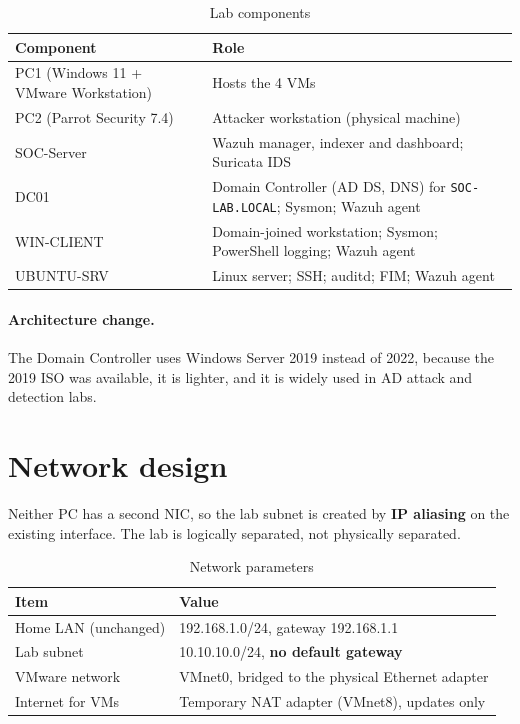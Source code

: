 \documentclass[11pt,a4paper]{article}
\begin{document}
\begin{table}[h]
\centering
\begin{tabularx}{\textwidth}{lX}
\toprule
Component & Role \\
\midrule
PC1 (Windows 11 + VMware Workstation) & Hosts the 4 VMs \\
PC2 (Parrot Security 7.4) & Attacker workstation (physical machine) \\
SOC-Server & Wazuh manager, indexer and dashboard; Suricata IDS \\
DC01 & Domain Controller (AD DS, DNS) for \texttt{SOC-LAB.LOCAL}; Sysmon; Wazuh agent \\
WIN-CLIENT & Domain-joined workstation; Sysmon; PowerShell logging; Wazuh agent \\
UBUNTU-SRV & Linux server; SSH; auditd; FIM; Wazuh agent \\
\bottomrule
\end{tabularx}
\caption{Lab components}
\end{table}

\paragraph{Architecture change.} The Domain Controller uses Windows Server 2019
instead of 2022, because the 2019 ISO was available, it is lighter, and it is
widely used in AD attack and detection labs.

\section{Network design}

Neither PC has a second NIC, so the lab subnet is created by \textbf{IP
aliasing} on the existing interface. The lab is logically separated, not
physically separated.

\begin{table}[h]
\centering
\begin{tabular}{ll}
\toprule
Item & Value \\
\midrule
Home LAN (unchanged) & 192.168.1.0/24, gateway 192.168.1.1 \\
Lab subnet & 10.10.10.0/24, \textbf{no default gateway} \\
VMware network & VMnet0, bridged to the physical Ethernet adapter \\
Internet for VMs & Temporary NAT adapter (VMnet8), updates only \\
\bottomrule
\end{tabular}
\caption{Network parameters}
\end{table}
\end{document}
